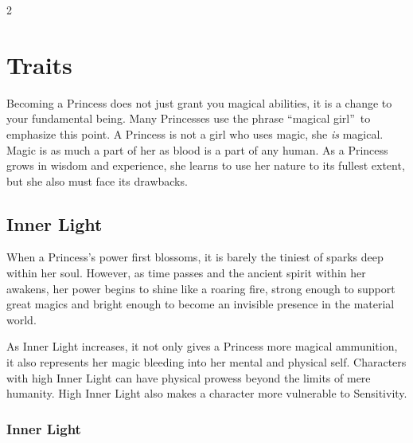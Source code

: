 \begin{multicols}{2}
    \bigsidebarend

\section*{Traits} 
\label{sec:Traits}

Becoming a Princess does not just grant you magical abilities, it is a change to your fundamental being. Many Princesses use the phrase \textquotedblleft magical girl\textquotedblright\, to emphasize this point. A Princess is not a girl who uses magic, she \textit{is} magical. Magic is as much a part of her as blood is a part of any human. As a Princess grows in wisdom and experience, she learns to use her nature to its fullest extent, but she also must face its drawbacks. 

\subsection*{Inner Light}
\label{subsec:InnerLight}
When a Princess's power first blossoms, it is barely the tiniest of sparks deep within her soul. However, as time passes and the ancient spirit within her awakens, her power begins to shine like a roaring fire, strong enough to support great magics and bright enough to become an invisible presence in the material world.

As Inner Light increases, it not only gives a Princess more magical ammunition, it also represents her magic bleeding into her mental and physical self. Characters with high Inner Light can have physical prowess beyond the limits of mere humanity. High Inner Light also makes a character more vulnerable to Sensitivity. 

	\bigsidebarstart
	
	\subsubsection*{Inner Light}
	

\end{multicols}
